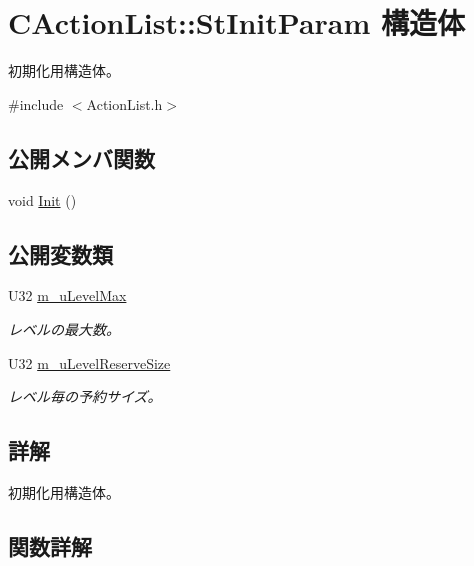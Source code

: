 \hypertarget{struct_c_action_list_1_1_st_init_param}{}\section{C\+Action\+List\+:\+:St\+Init\+Param 構造体}
\label{struct_c_action_list_1_1_st_init_param}


初期化用構造体。  




{\ttfamily \#include $<$Action\+List.\+h$>$}

\subsection*{公開メンバ関数}
\begin{DoxyCompactItemize}
\item 
void \hyperlink{struct_c_action_list_1_1_st_init_param_a9ae0b36a7a6bf7b30d1d07f989ebac5e}{Init} ()
\end{DoxyCompactItemize}
\subsection*{公開変数類}
\begin{DoxyCompactItemize}
\item 
U32 \hyperlink{struct_c_action_list_1_1_st_init_param_a5c56d351fbe8dd96bf418441423ba37f}{m\+\_\+u\+Level\+Max}
\begin{DoxyCompactList}\small\item\em レベルの最大数。 \end{DoxyCompactList}\item 
U32 \hyperlink{struct_c_action_list_1_1_st_init_param_ac7e4a40b8e2352cfc43cb23c657a60d4}{m\+\_\+u\+Level\+Reserve\+Size}
\begin{DoxyCompactList}\small\item\em レベル毎の予約サイズ。 \end{DoxyCompactList}\end{DoxyCompactItemize}


\subsection{詳解}
初期化用構造体。 

\subsection{関数詳解}
\hypertarget{struct_c_action_list_1_1_st_init_param_a9ae0b36a7a6bf7b30d1d07f989ebac5e}{}
